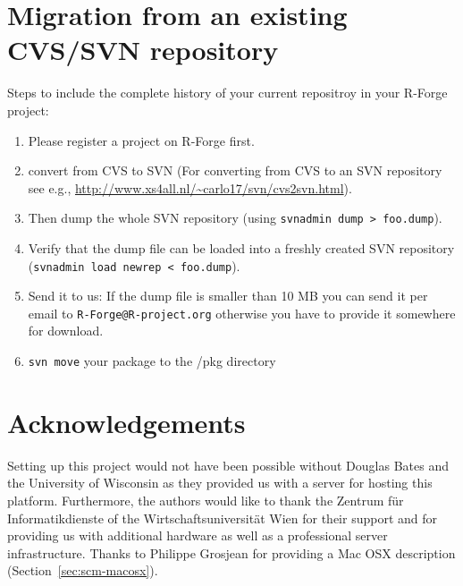 \documentclass[a4paper]{report}
\let\code=\texttt
\let\email=\texttt
\begin{document}
\section{Migration from an existing CVS/SVN repository}

Steps to include the complete history of your current repositroy in
your R-Forge project:
\begin{enumerate}
\item Please register a project on R-Forge first.
\item convert from CVS to SVN (For converting from CVS to an SVN
  repository see e.g.,
  \url{http://www.xs4all.nl/~carlo17/svn/cvs2svn.html}).
\item Then dump the whole SVN repository (using \code{svnadmin dump >
    foo.dump}).
\item Verify that the dump file can be loaded into a freshly created
  SVN repository (\code{svnadmin load newrep < foo.dump}). 
\item Send it to us: If the dump file is smaller than 10 MB you can
  send it per email to \email{R-Forge@R-project.org} otherwise you have to
  provide it somewhere for download. 
\item \code{svn move} your package to the /pkg directory
\end{enumerate}


\section{Acknowledgements}

Setting up this project would not have been possible without Douglas
Bates and the University of Wisconsin as they provided us with a
server for hosting this platform. Furthermore, 
the authors would like to thank the Zentrum f\"ur Informatikdienste  
of the Wirtschaftsuniversit\"at Wien for
their support and for providing us with additional hardware as well as a
professional server infrastructure. 
Thanks to Philippe Grosjean for
providing a Mac OSX description (Section~\ref{sec:scm-macosx}).




\end{document}
